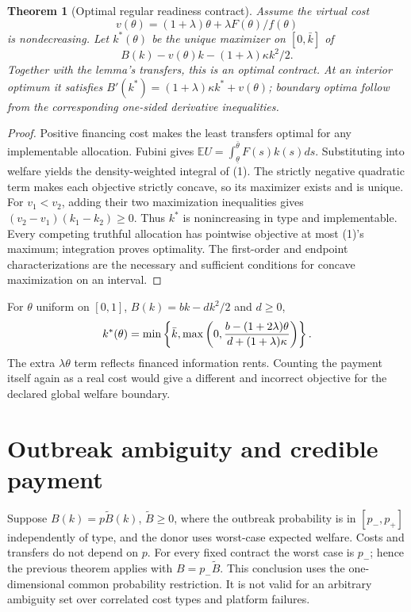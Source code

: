 \documentclass[11pt]{article}
\newtheorem{theorem}{Theorem}
\theoremstyle{definition}
\begin{document}
\begin{theorem}[Optimal regular readiness contract]
Assume the virtual cost
\[
 v(\theta)=(1+\lambda)\theta+\lambda F(\theta)/f(\theta)
\]
is nondecreasing. Let $k^*(\theta)$ be the unique maximizer on
$[0,\bar k]$ of
\[
 B(k)-v(\theta)k-(1+\lambda)\kappa k^2/2. \tag{1}
\]
Together with the lemma's transfers, this is an optimal contract. At an
interior optimum it satisfies
$B'(k^*)=(1+\lambda)\kappa k^*+v(\theta)$; boundary optima follow
from the corresponding one-sided derivative inequalities.
\end{theorem}
\begin{proof}
Positive financing cost makes the least transfers optimal for any implementable
allocation. Fubini gives
$\mathbb E U=\int_{\underline\theta}^{\bar\theta}F(s)k(s)ds$.
Substituting into welfare yields the density-weighted integral of (1).
The strictly negative quadratic term makes each objective strictly concave,
so its maximizer exists and is unique. For $v_1<v_2$, adding their two
maximization inequalities gives $(v_2-v_1)(k_1-k_2)\ge0$.
Thus $k^*$ is nonincreasing in type and implementable. Every competing
truthful allocation has pointwise objective at most (1)'s maximum; integration
proves optimality. The first-order and endpoint characterizations are the
necessary and sufficient conditions for concave maximization on an interval.
\end{proof}

For $\theta$ uniform on $[0,1]$, $B(k)=bk-dk^2/2$ and $d\ge0$,
\[
 k^*(\theta)=\min\left\{\bar k,
 \max\left(0,{b-(1+2\lambda)\theta\over d+(1+\lambda)\kappa}\right)\right\}.
\]
The extra $\lambda\theta$ term reflects financed information rents. Counting
the payment itself again as a real cost would give a different and incorrect
objective for the declared global welfare boundary.

\section*{Outbreak ambiguity and credible payment}
Suppose $B(k)=p\widetilde B(k)$, $\widetilde B\ge0$, where the outbreak
probability is in $[p_-,p_+]$ independently of type, and the donor uses
worst-case expected welfare. Costs and transfers do not depend on $p$.
For every fixed contract the worst case is $p_-$; hence the previous theorem
applies with $B=p_-\widetilde B$. This conclusion uses the one-dimensional
common probability restriction. It is not valid for an arbitrary ambiguity
set over correlated cost types and platform failures.
\end{document}
